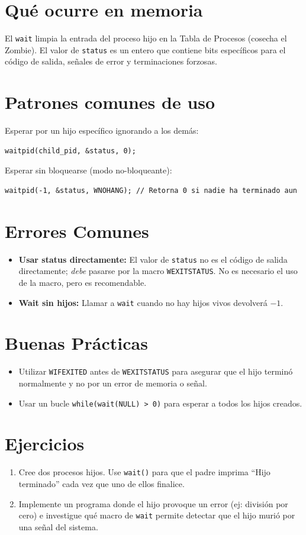 \documentclass[12pt,a4paper]{article}
\begin{document}
\section{Qué ocurre en memoria}
El \texttt{wait} limpia la entrada del proceso hijo en la Tabla de Procesos (cosecha el Zombie). El valor de \texttt{status} es un entero que contiene bits específicos para el código de salida, señales de error y terminaciones forzosas.

\section{Patrones comunes de uso}
Esperar por un hijo específico ignorando a los demás:
\begin{lstlisting}
waitpid(child_pid, &status, 0);
\end{lstlisting}
Esperar sin bloquearse (modo no-bloqueante):
\begin{lstlisting}
waitpid(-1, &status, WNOHANG); // Retorna 0 si nadie ha terminado aun
\end{lstlisting}

\section{Errores Comunes}
\begin{itemize}
    \item \textbf{Usar status directamente:} El valor de \texttt{status} no es el código de salida directamente; \textit{debe} pasarse por la macro \texttt{WEXITSTATUS}. No es necesario el uso de la macro, pero es recomendable.
    \item \textbf{Wait sin hijos:} Llamar a \texttt{wait} cuando no hay hijos vivos devolverá $-1$.
\end{itemize}

\section{Buenas Prácticas}
\begin{itemize}
    \item Utilizar \texttt{WIFEXITED} antes de \texttt{WEXITSTATUS} para asegurar que el hijo terminó normalmente y no por un error de memoria o señal.
    \item Usar un bucle \texttt{while(wait(NULL) > 0)} para esperar a todos los hijos creados.
\end{itemize}

\section{Ejercicios}
\begin{enumerate}
    \item Cree dos procesos hijos. Use \texttt{wait()} para que el padre imprima ``Hijo terminado'' cada vez que uno de ellos finalice.
    \item Implemente un programa donde el hijo provoque un error (ej: división por cero) e investigue qué macro de \texttt{wait} permite detectar que el hijo murió por una señal del sistema.
\end{enumerate}
\end{document}
